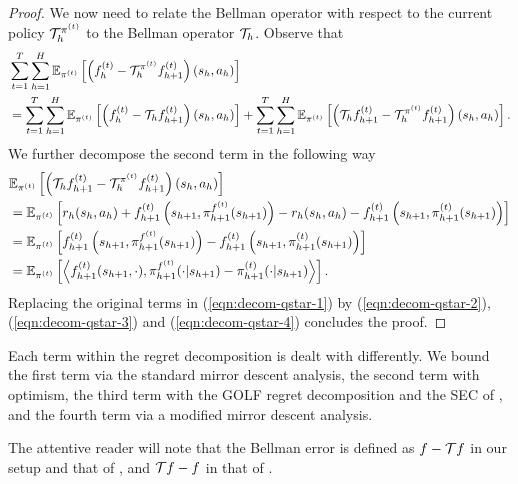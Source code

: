\begin{proof}
    We now need to relate the Bellman operator with respect to the current policy ${\mathcal{T}}_h^{\pi^{(t)}}$ to the Bellman operator ${\mathcal{T}}_h$. Observe that
    \begin{align}\label{eqn:decom-qstar-3}
        &\sum_{t=1}^T \sum_{h=1}^H\mathbb{E}_{\pi^{(t)}}\left[\left(f_h^{(t)}-{\mathcal{T}}_h^{\pi^{(t)}}f_{h+1}^{(t)}\right)\left(s_h, a_h\right)\right] \nonumber\\
        &= \sum_{t=1}^T \sum_{h=1}^H\mathbb{E}_{\pi^{(t)}}\left[\left(f_h^{(t)} - {\mathcal{T}}_h f_{h+1}^{(t)} \right)\left(s_h, a_h\right)\right]  + \sum_{t=1}^T \sum_{h=1}^H\mathbb{E}_{\pi^{(t)}}\left[\left({\mathcal{T}}_h f_{h+1}^{(t)} -{\mathcal{T}}_h^{\pi^{(t)}}f_{h+1}^{(t)}\right)\left(s_h, a_h\right)\right]. 
\end{align}
We further decompose the second term in the following way
\begin{align}\label{eqn:decom-qstar-4}
& \mathbb{E}_{\pi^{(t)}}\left[\left({\mathcal{T}}_h f_{h+1}^{(t)} -{\mathcal{T}}_h^{\pi^{(t)}}f_{h+1}^{(t)}\right)\left(s_h, a_h\right)\right]\nonumber\\
        &= \mathbb{E}_{\pi^{(t)}}\left[r_h(s_h, a_h) + f_{h+1}^{(t)}\left(s_{h+1}, \pi_{h+1}^{f^{(t)}}(s_{h+1})\right) - r_h(s_h, a_h) - f_{h+1}^{(t)}\left(s_{h+1}, \pi_{h+1}^{(t)}(s_{h+1})\right) \right] \nonumber\\
        &= \mathbb{E}_{\pi^{(t)}}\left[f_{h+1}^{(t)}\left(s_{h+1}, \pi_{h+1}^{f^{(t)}}(s_{h+1})\right) - f_{h+1}^{(t)}\left(s_{h+1}, \pi_{h+1}^{(t)}(s_{h+1})\right) \right] \nonumber\\
        &=  \mathbb{E}_{\pi^{(t)}}\left[\left\langle f_{h+1}^{(t)}(s_{h+1},\cdot), \pi_{h+1}^{f^{(t)}} (\cdot | s_{h+1}) -\pi_{h+1}^{(t)}(\cdot | s_{h+1}) \right\rangle\right].
    \end{align}
    Replacing the original terms in (\ref{eqn:decom-qstar-1}) by (\ref{eqn:decom-qstar-2}), (\ref{eqn:decom-qstar-3}) and (\ref{eqn:decom-qstar-4}) concludes the proof.
\end{proof}

Each term within the regret decomposition is dealt with differently. We bound the first term via the standard mirror descent analysis, the second term with optimism, the third term with the GOLF regret decomposition and the SEC of \citet{xie2022role}, and the fourth term via a modified mirror descent analysis. 

The attentive reader will note that the Bellman error is defined as $f - {\mathcal{T}} f$ in our setup and that of \citet{liu2023optimistic}, and ${\mathcal{T}} f - f$ in that of \citet{zhong2023theoretical}.

